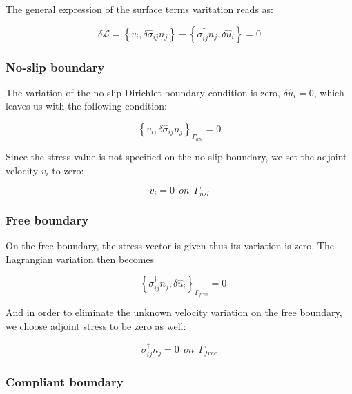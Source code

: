 The general expression of the surface terms varitation reads as:

\begin{equation}
\label{eq:AdjLagrangVarSurface}
\delta \mathcal{L} = \left\{ v_i , \delta \hat{\sigma}_{ij} n_j \right\} - \left\{\sigma_{ij}^\dagger  n_j,  \delta \hat{u}_i \right\} = 0
\end{equation}

\subsubsection{No-slip boundary}

The variation of the no-slip Dirichlet boundary condition is zero, $\delta \hat{u}_i = 0$, which leaves us with the following condition:

\begin{equation}
\left\{ v_i, \delta \hat{\sigma}_{ij}  n_j \right\}_{\Gamma_{nsl}} = 0
\end{equation}

Since the stress value is not specified on the no-slip boundary, we set the adjoint velocity $v_i$ to zero:

\begin{equation}
v_i = 0 \ \ on \ \ \Gamma_{nsl}
\end{equation}

\subsubsection{Free boundary}

On the free boundary, the stress vector is given thus its variation is zero. The Lagrangian variation then becomes

\begin{equation}
- \left\{\sigma_{ij}^\dagger  n_j,  \delta \hat{u}_i \right\}_{\Gamma_{free}} = 0
\end{equation}

And in order to eliminate the unknown velocity variation on the free boundary, we choose adjoint stress to be zero as well:

\begin{equation}
\sigma_{ij}^\dagger  n_j = 0 \ \ on \ \ \Gamma_{free}
\end{equation}

\subsubsection{Compliant boundary}

